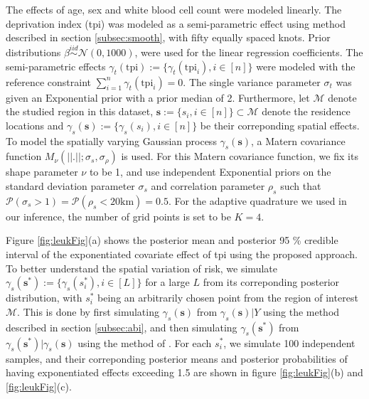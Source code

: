 \documentclass[ba]{imsart}
\begin{document}
The effects of age, sex and white blood cell count were modeled linearly. The deprivation index (tpi) was modeled as a semi-parametric effect using method described in section \ref{subsec:smooth}, with fifty equally spaced knots. Prior distributions $\beta \stackrel{iid}{\sim} \mathcal{N}(0, 1000)$, were used for the linear regression coefficients. The semi-parametric effects $\gamma_t(\text{tpi}) := \{\gamma_t(\text{tpi}_i), i\in [n]\}$ were modeled with the reference constraint $\sum_{i=1}^{n}\gamma_t(\text{tpi}_i) = 0$. The single variance parameter $\sigma_t$ was given an $\text{Exponential}$ prior with a prior median of 2. Furthermore, let $\mathcal{M}$ denote the studied region in this dataset, $\boldsymbol{s} := \{s_i, i \in [n]\} \subset \mathcal{M}$ denote the residence locations and $\gamma_s(\boldsymbol{s}) := \{\gamma_s(s_i), i \in [n]\}$ be their correponding spatial effects. To model the spatially varying Gaussian process $\gamma_s(\boldsymbol{s})$, a Matern covariance function $M_\nu(||.||;\sigma_s,\sigma_\rho)$ is used. For this Matern covariance function, we fix its shape parameter $\nu$ to be 1, and use independent Exponential priors on the standard deviation parameter $\sigma_s$ and correlation parameter $\rho_s$ such that $\mathcal{P}(\sigma_s > 1) = \mathcal{P}(\rho_s < 20 \text{km}) = 0.5$.
For the adaptive quadrature we used in our inference, the number of grid points is set to be $K = 4$. 

Figure \ref{fig:leukFig}(a) shows the posterior mean and posterior 95 \% credible interval of the exponentiated covariate effect of tpi using the proposed approach. To better understand the spatial variation of risk, we simulate $\gamma_s(\boldsymbol{s^*}):= \{\gamma_s(s_i^*), i\in [L]\}$ for a large $L$ from its correponding posterior distribution, with $s_i^*$ being an arbitrarily chosen point from the region of interest $\mathcal{M}$. This is done by first simulating $\gamma_s(\boldsymbol{s})$ from $\gamma_s(\boldsymbol{s})|Y$ using the method described in section \ref{subsec:abi}, and then simulating $\gamma_s(\boldsymbol{s}^*)$ from $\gamma_s(\boldsymbol{s}^*)|\gamma_s(\boldsymbol{s})$ using the method of \cite{schlather2015analysis}. For each $s_i^*$, we simulate 100 independent samples, and their correponding posterior means and posterior probabilities of having exponentiated effects exceeding 1.5 are shown in figure \ref{fig:leukFig}(b) and \ref{fig:leukFig}(c).
\end{document}
